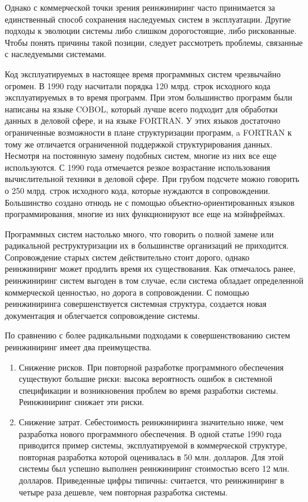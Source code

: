 \documentclass{../../text-style}
\begin{document}
Однако с коммерческой точки зрения реинжиниринг часто принимается за единственный способ сохранения наследуемых систем в эксплуатации. Другие подходы к эволюции системы либо слишком дорогостоящие, либо рискованные. Чтобы понять причины такой позиции, следует рассмотреть проблемы, связанные с наследуемыми системами.

Код эксплуатируемых в настоящее время программных систем чрезвычайно огромен. В 1990 году насчитали порядка 120 млрд. строк исходного кода эксплуатируемых в то время программ. При этом большинство программ были написаны на языке COBOL, который лучше всего подходит для обработки данных в деловой сфере, и на языке FORTRAN. У этих языков достаточно ограниченные возможности в плане структуризации программ, a FORTRAN к тому же отличается ограниченной поддержкой структурирования данных. Несмотря на постоянную замену подобных систем, многие из них все еще используются. С 1990 года отмечается резкое возрастание использования вычислительной техники в деловой сфере. При грубом подсчете можно говорить о 250 млрд. строк исходного кода, которые нуждаются в сопровождении. Большинство создано отнюдь не с помощью объектно-ориентированных языков программирования, многие из них функционируют все еще на мэйнфреймах.

Программных систем настолько много, что говорить о полной замене или радикальной реструктуризации их в большинстве организаций не приходится. Сопровождение старых систем действительно стоит дорого, однако реинжиниринг может продлить время их существования. Как отмечалось ранее, реинжиниринг систем выгоден в том случае, если система обладает определенной коммерческой ценностью, но дорога в сопровождении. С помощью реинжиниринга совершенствуется системная структура, создается новая документация и облегчается сопровождение системы.

По сравнению с более радикальными подходами к совершенствованию систем реинжиниринг имеет два преимущества.

\begin{enumerate}
    \item Снижение рисков. При повторной разработке программного обеспечения существуют большие риски: высока вероятность ошибок в системной спецификации и возникновения проблем во время разработки системы. Реинжиниринг снижает эти риски.
    \item Снижение затрат. Себестоимость реинжиниринга значительно ниже, чем разработка нового программного обеспечения. В одной статье 1990 года приводится пример системы, эксплуатируемой в коммерческой структуре, повторная разработка которой оценивалась в 50 млн. долларов. Для этой системы был успешно выполнен реинжиниринг стоимостью всего 12 млн. долларов. Приведенные цифры типичны: считается, что реинжиниринг в четыре раза дешевле, чем повторная разработка системы.
\end{enumerate}
\end{document}
